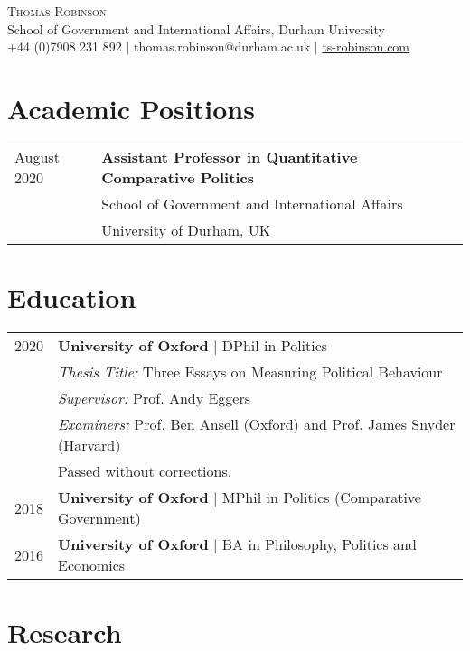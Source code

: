 \documentclass[11pt, a4paper]{article}
\begin{document}
 \begin{center}
    \textsc{\huge Thomas Robinson} \\
    School of Government and International Affairs, Durham University \\
    +44 (0)7908 231 892 $|$ thomas.robinson@durham.ac.uk $|$ \href{https://ts-robinson.com}{ts-robinson.com}
 \end{center}

\section*{Academic Positions}
\begin{tabular}{ll}
    August 2020 & \textbf{Assistant Professor in Quantitative Comparative Politics} \\
    & School of Government and International Affairs \\
    & University of Durham, UK \\

 \end{tabular}

 \section*{Education}
 \begin{tabular}{ll}
    2020 & \textbf{University of Oxford} $|$ DPhil in Politics \\
    	 & \textit{Thesis Title:} Three Essays on Measuring Political Behaviour \\
    	 & \textit{Supervisor:} Prof. Andy Eggers\\
    	 & \textit{Examiners:} Prof. Ben Ansell (Oxford) and Prof. James Snyder (Harvard) \\
    	 & Passed without corrections. \\
    2018  & \textbf{University of Oxford} $|$ MPhil in Politics (Comparative Government) \\
    2016 & \textbf{University of Oxford} $|$ BA in Philosophy, Politics and Economics
 \end{tabular}

 \section*{Research}

\end{document}
